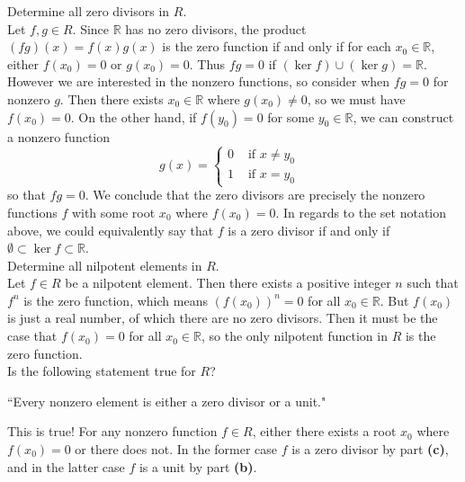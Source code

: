 \documentclass{article}
\newenvironment{problem2}[1]{\noindent {\bf (#1}}
{\medskip}
\begin{document}
\begin{problem2}{c)} Determine all zero divisors in $R$.\\

Let $f,g\in R$. Since $\mathbb{R}$ has no zero divisors, the product $(fg)(x)=f(x)g(x)$ is the zero function if and only if for each $x_0\in\mathbb{R}$, either $f(x_0)=0$ or $g(x_0)=0$. Thus $fg=0$ if $(\ker f )\cup( \ker g) = \mathbb{R}$. However we are interested in the nonzero functions, so consider when $fg=0$ for nonzero $g$. Then there exists $x_0\in \mathbb{R}$ where $g(x_0)\ne0$, so we must have $f(x_0)=0.$ On the other hand, if $f(y_0)=0$ for some $y_0\in\mathbb{R}$, we can construct a nonzero function $$g(x)=\begin{cases} 0 & \text{ if $x\ne y_0$ }\\ 1 & \text{ if $x=y_0$ }\end{cases}$$ so that $fg=0$. We conclude that the zero divisors are precisely the nonzero functions $f$ with some root $x_0$ where $f(x_0)=0$. In regards to the set notation above, we could equivalently say that $f$ is a zero divisor if and only if $\emptyset\subset \ker f \subset \mathbb{R}$.
\end{problem2}\\

\begin{problem2}{d)} Determine all nilpotent elements in $R$.\\

Let $f\in R$ be a nilpotent  element. Then there exists a positive integer $n$ such that $f^n$ is the zero function, which means $(f(x_0))^n=0$ for all $x_0\in\mathbb{R}$. But $f(x_0)$ is just a real number, of which there are no zero divisors. Then it must be the case that $f(x_0)=0$ for all $x_0\in\mathbb{R}$, so the only nilpotent function in $R$ is the zero function.
\end{problem2}\\


\begin{problem2}{e)} Is the following statement true for $R$? \begin{center} ``Every nonzero element is either a zero divisor or a unit."\end{center}

This is true! For any nonzero function $f\in R$, either there exists a root $x_0$ where $f(x_0)=0$ or there does not. In the former case $f$ is a zero divisor by part \textbf{(c)}, and in the latter case $f$ is a unit by part \textbf{(b)}. \end{problem2}\\
\end{document}

